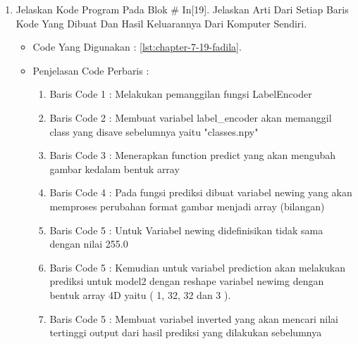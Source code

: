 \begin{enumerate}
\begin{itemize}
\begin{enumerate}
\end{enumerate}
\par
\par
\item Hasil : \ref{chapter-7-in-18-fadila}
\par
\par
\begin{figure}[!hbtp]
\centering
\texttt{[image: figures/chapter-7-in-18-fadila.jpg]}
\caption{Code Program Pada In [18] - fadila}
\label{chapter-7-in-18-fadila}
\end{figure}
\par
\par
\end{itemize}
\par
\par
\par
\item Jelaskan Kode Program Pada Blok \# In[19]. Jelaskan Arti Dari Setiap Baris Kode Yang Dibuat Dan Hasil Keluarannya Dari Komputer Sendiri.
\begin{itemize}
\item Code Yang Digunakan : \ref{lst:chapter-7-19-fadila}.

\par
\par
\item Penjelasan Code Perbaris	: 
\begin{enumerate}
\item Baris Code 1	: Melakukan pemanggilan fungsi LabelEncoder
\item Baris Code 2	: Membuat variabel label\_encoder akan memanggil class yang disave sebelumnya yaitu "classes.npy"
\item Baris Code 3	: Menerapkan function predict yang akan mengubah gambar kedalam bentuk array
\item Baris Code 4 	: Pada fungsi prediksi dibuat variabel newing yang akan memproses perubahan format gambar menjadi array (bilangan)
\item Baris Code 5	: Untuk Variabel newing didefinisikan tidak sama dengan nilai 255.0
\item Baris Code 5	: Kemudian untuk variabel prediction akan melakukan prediksi untuk model2 dengan reshape variabel newimg dengan bentuk array 4D yaitu ( 1, 32, 32 dan 3 ).
\item Baris Code 5	: Membuat variabel inverted yang akan mencari nilai tertinggi output dari hasil prediksi yang dilakukan sebelumnya

\end{enumerate}
\end{itemize}
\end{enumerate}
